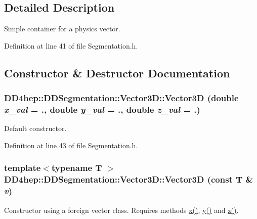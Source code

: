 \subsection{Detailed Description}
Simple container for a physics vector. 

Definition at line 41 of file Segmentation.h.

\subsection{Constructor \& Destructor Documentation}
\hypertarget{struct_d_d4hep_1_1_d_d_segmentation_1_1_vector3_d_a2b4422ed26bde66eeaac8bc46db07280}{
\subsubsection[{Vector3D}]{\setlength{\rightskip}{0pt plus 5cm}DD4hep::DDSegmentation::Vector3D::Vector3D (double {\em x\_\-val} = {.}, \/  double {\em y\_\-val} = {.}, \/  double {\em z\_\-val} = {.})}}
\label{struct_d_d4hep_1_1_d_d_segmentation_1_1_vector3_d_a2b4422ed26bde66eeaac8bc46db07280}


Default constructor. 

Definition at line 43 of file Segmentation.h.\hypertarget{struct_d_d4hep_1_1_d_d_segmentation_1_1_vector3_d_ab9ae20339fc5ed846ac128fe2a2d7965}{
\subsubsection[{Vector3D}]{\setlength{\rightskip}{0pt plus 5cm}template$<$typename T $>$ DD4hep::DDSegmentation::Vector3D::Vector3D (const {\bf T} \& {\em v})}}
\label{struct_d_d4hep_1_1_d_d_segmentation_1_1_vector3_d_ab9ae20339fc5ed846ac128fe2a2d7965}


Constructor using a foreign vector class. Requires methods \hyperlink{struct_d_d4hep_1_1_d_d_segmentation_1_1_vector3_d_a12a06ce31d8ebe61ef30183e16d88b6a}{x()}, \hyperlink{struct_d_d4hep_1_1_d_d_segmentation_1_1_vector3_d_a315b5dbb6abf747eac4a0432826b482f}{y()} and \hyperlink{struct_d_d4hep_1_1_d_d_segmentation_1_1_vector3_d_ab30126e2b17eeb8638b4c5ebbb1b5278}{z()}. 

